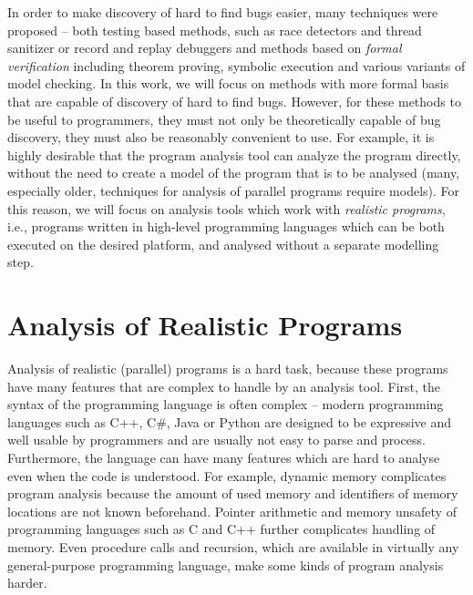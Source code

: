 In order to make discovery of hard to find bugs easier, many techniques were proposed -- both testing based methods, such as race detectors and thread sanitizer or record and replay debuggers  and methods based on \emph{formal verification} including theorem proving, symbolic execution and various variants of model checking.
In this work, we will focus on methods with more formal basis that are capable of discovery of hard to find bugs.
However, for these methods to be useful to programmers, they must not only be theoretically capable of bug discovery, they must also be reasonably convenient to use.
For example, it is highly desirable that the program analysis tool can analyze the program directly, without the need to create a model of the program that is to be analysed (many, especially older, techniques for analysis of parallel programs require models).
For this reason, we will focus on analysis tools which work with \emph{realistic programs}, i.e., programs written in high-level programming languages which can be both executed on the desired platform, and analysed without a separate modelling step.

\section{Analysis of Realistic Programs}\label{sec:intro:programs}

Analysis of realistic (parallel) programs is a hard task, because these programs have many features that are complex to handle by an analysis tool.
First, the syntax of the programming language is often complex -- modern programming languages such as C++, C\#, Java or Python are designed to be expressive and well usable by programmers and are usually not easy to parse and process.
Furthermore, the language can have many features which are hard to analyse even when the code is understood.
For example, dynamic memory complicates program analysis because the amount of used memory and identifiers of memory locations are not known beforehand.
Pointer arithmetic and memory unsafety of programming languages such as C and C++ further complicates handling of memory.
Even procedure calls and recursion, which are available in virtually any general-purpose programming language, make some kinds of program analysis harder.

